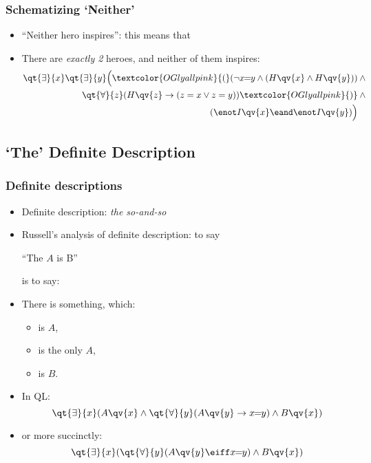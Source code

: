 \begin{frame}
    \frametitle{Schematizing `Neither'}

\begin{itemize}[<+->]
\item ``Neither hero inspires'': this means that 
\item[] There are \emph{exactly 2} heroes, and neither of them inspires:
\begin{align*}
\qt{\exists}{x}\qt{\exists}{y}\Big(\textcolor{OGlyallpink}{(}(\lnot x\!\!=\!\!y \land (H\qv{x} \land H\qv{y})) & {}\land {}\\
\qt{\forall}{z}(H\qv{z} \to (z = x \lor z = y))\textcolor{OGlyallpink}{)} &{} \land {}\\
(\enot I\qv{x} \eand \enot I\qv{y})\Big)&
\end{align*}
\end{itemize}
\end{frame}

\subsection{`The' Definite Description}

\begin{frame}
    \frametitle{Definite descriptions}

\begin{itemize}[<+->]
\item Definite description: \emph{the so-and-so}
\item Russell's analysis of definite description: to say\\[1ex]
\centerline{``The $A$ is B''}
is to say:
\item There is something, which:
\begin{itemize}[<+->]
\item is $A$,
\item is the only $A$,
\item is $B$.
\end{itemize}
\item In QL:
\[
\qt{\exists}{x}(A\qv{x} \land \qt{\forall}{y}(A\qv{y} \to x\!\!=\!\!y) \land B\qv{x})
\]
\item or more succinctly:
\[
\qt{\exists}{x}(\qt{\forall}{y}(A\qv{y} \eiff x\!\!=\!\!y) \land B\qv{x})
\]
\end{itemize}
\end{frame}

